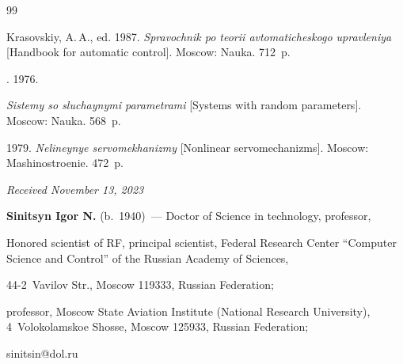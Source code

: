 {{\begin{thebibliography}{99}

Krasovskiy, A.\,A., ed. 1987. \textit{Spravochnik po teorii avtomaticheskogo upravleniya} [Handbook for automatic control]. Moscow: Nauka. 712~p.





. 1976. 

\textit{Sistemy so sluchaynymi parametrami} [Systems with random parameters]. Moscow: Nauka. 568~p.





 1979. \textit{Nelineynye servomekhanizmy} [Nonlinear servomechanizms]. Moscow: Mashinostroenie. 472~p.

\end{thebibliography}

} }



\vspace*{-6pt}



\hfill{\small\textit{Received November 13, 2023}} 



\vspace*{-12pt} 



\Contrl



\vspace*{-4pt}



\noindent

\textbf{Sinitsyn Igor N.} (b.\ 1940)~--- Doctor of Science in technology, professor, 

Honored scientist of RF, principal scientist, Federal Research Center ``Computer Science and Control'' of the Russian Academy of Sciences, 

44-2~Vavilov Str., Moscow 119333, Russian Federation; 

professor, Moscow State Aviation Institute (National Research University), 4~Volokolamskoe Shosse, Moscow 125933, Russian Federation; 

\mbox{sinitsin@dol.ru}







\label{end\stat}



\renewcommand{\bibname}{\protect\rm Литература} 

